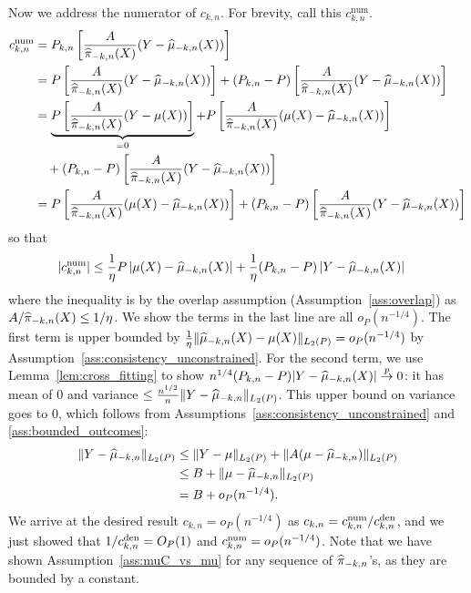 Now we address the numerator of $c_{k,n}$. 
For brevity, call this $c_{k,n}^{\text{num}}$.
\begin{align}
c_{k,n}^{\text{num}} &=    P_{k,n}\left[\frac{A}{\widehat{\pi}_{-k,n}(X)}(Y-\widehat{\mu}_{-k,n}(X))\right] 
\\&= P\left[\frac{A}{\widehat{\pi}_{-k,n}(X)}(Y-\widehat{\mu}_{-k,n}(X))\right] 
+(P_{k,n}-P)\left[\frac{A}{\widehat{\pi}_{-k,n}(X)}(Y-\widehat{\mu}_{-k,n}(X))\right]
\\&= \underbrace{P\left[\frac{A}{\widehat{\pi}_{-k,n}(X)}(Y-\mu(X))\right]}_{=0}
+P\left[\frac{A}{\widehat{\pi}_{-k,n}(X)}(\mu(X)-\widehat{\mu}_{-k,n}(X))\right]\\&\quad 
+(P_{k,n}-P)\left[\frac{A}{\widehat{\pi}_{-k,n}(X)}(Y-\widehat{\mu}_{-k,n}(X))\right]\nonumber
\\&=P\left[\frac{A}{\widehat{\pi}_{-k,n}(X)}(\mu(X)-\widehat{\mu}_{-k,n}(X))\right]
+(P_{k,n}-P)\left[\frac{A}{\widehat{\pi}_{-k,n}(X)}(Y-\widehat{\mu}_{-k,n}(X))\right]
\end{align}
so that
\begin{align}
    |c_{k,n}^{\rm num}| & \leq %
    \frac{1}{\eta} P\left|\mu(X)-\what\mu_{-k,n}(X)\right|
    +\frac{1}{\eta} (P_{k,n}-P)\left|Y-\what\mu_{-k,n}(X)\right|
\end{align}
where the inequality is by the overlap assumption (Assumption~\ref{ass:overlap}) as $A/\widehat{\pi}_{-k,n}(X)\leq 1/\eta$. 
We show the terms in the last line are all $o_P(n^{-1/4})$. 
The first term is upper bounded by $\frac{1}{\eta} \|\widehat{\mu}_{-k,n}(X)-\mu(X)\|_{L_2(P)}=o_P(n^{-1/4})$ by Assumption~\ref{ass:consistency_unconstrained}. 
For the second term, 
we use Lemma~\ref{lem:cross_fitting} to show
$n^{1/4}(P_{k,n}-P)|Y-\widehat{\mu}_{-k,n}(X)|\overset{p}{\to}0$:
it has mean of 0 and variance
$\leq \frac{n^{1/2}}{n}\|Y-\widehat{\mu}_{-k,n}\|_{L_2(P)}$. 
This upper bound on variance goes to 0, %
which follows from Assumptions~\ref{ass:consistency_unconstrained} and \ref{ass:bounded_outcomes}:
\begin{align*}
    \|Y-\widehat{\mu}_{-k,n}\|_{L_2(P)} &\leq \|Y-\mu\|_{L_2(P)} + \|A(\mu-\widehat{\mu}_{-k,n})\|_{L_2(P)} \\
    &\leq B + \|\mu-\widehat{\mu}_{-k,n}\|_{L_2(P)} \\
    &= B + o_P(n^{-1/4}).
\end{align*}
We arrive at the desired result $c_{k,n}=o_P(n^{-1/4})$ as 
$c_{k,n}=c_{k,n}^{\rm num}/c_{k,n}^{\rm den}$, and we just showed that 
$1/c_{k,n}^{\rm den}=O_P(1)$ and 
$c_{k,n}^{\rm num}=o_P(n^{-1/4})$. 
Note that we have shown Assumption~\ref{ass:muC_vs_mu} for any sequence of $\widehat{\pi}_{-k,n}$'s, as they are bounded by a constant. 


